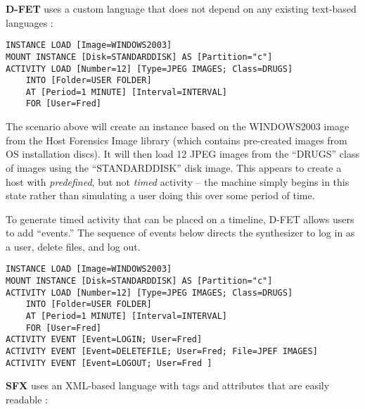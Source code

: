 \documentclass[letterpaper,12pt]{report}
\begin{document}
\textbf{D-FET} uses a custom language that does not depend on any
existing text-based languages
\cite{williamCloudbasedDigitalForensics2011}:

\begin{lstlisting}
INSTANCE LOAD [Image=WINDOWS2003] 
MOUNT INSTANCE [Disk=STANDARDDISK] AS [Partition="c"] 
ACTIVITY LOAD [Number=12] [Type=JPEG IMAGES; Class=DRUGS] 
    INTO [Folder=USER FOLDER] 
    AT [Period=1 MINUTE] [Interval=INTERVAL] 
    FOR [User=Fred]
\end{lstlisting}

The scenario above will create an instance based on the WINDOWS2003
image from the Host Forensics Image library (which contains pre-created
images from OS installation discs). It will then load 12 JPEG images
from the ``DRUGS'' class of images using the ``STANDARDDISK'' disk
image. This appears to create a host with \emph{predefined}, but not
\emph{timed} activity -- the machine simply begins in this state rather
than simulating a user doing this over some period of time.

To generate timed activity that can be placed on a timeline, D-FET
allows users to add ``events.'' The sequence of events below directs the
synthesizer to log in as a user, delete files, and log out.

\begin{lstlisting}
INSTANCE LOAD [Image=WINDOWS2003] 
MOUNT INSTANCE [Disk=STANDARDDISK] AS [Partition="c"] 
ACTIVITY LOAD [Number=12] [Type=JPEG IMAGES; Class=DRUGS] 
    INTO [Folder=USER FOLDER] 
    AT [Period=1 MINUTE] [Interval=INTERVAL] 
    FOR [User=Fred]
ACTIVITY EVENT [Event=LOGIN; User=Fred] 
ACTIVITY EVENT [Event=DELETEFILE; User=Fred; File=JPEF IMAGES] 
ACTIVITY EVENT [Event=LOGOUT; User=Fred ]
\end{lstlisting}

\textbf{SFX} uses an XML-based language with tags and attributes that
are easily readable \cite{russellForensicImageDescription2012}:
\end{document}
